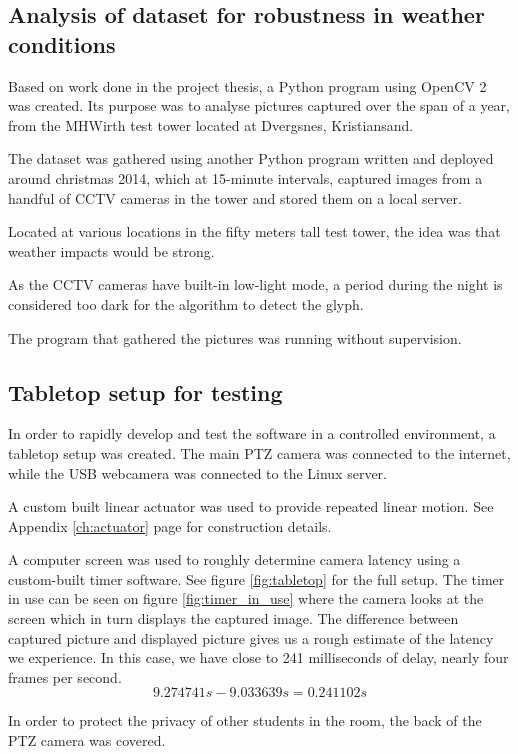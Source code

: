 \subsection{Analysis of dataset for robustness in weather conditions}
Based on work done in the project thesis, a Python program using OpenCV 2 was created. Its purpose was to analyse pictures captured over the span of a year, from the MHWirth test tower located at Dvergsnes, Kristiansand.

The dataset was gathered using another Python program written and deployed around christmas 2014, which at 15-minute intervals, captured images from a handful of CCTV cameras in the tower and stored them on a local server.

Located at various locations in the fifty meters tall test tower, the idea was that weather impacts would be strong.

As the CCTV cameras have built-in low-light mode, a period during the night is considered too dark for the algorithm to detect the glyph.

The program that gathered the pictures was running without supervision.

\subsection{Tabletop setup for testing}
In order to rapidly develop and test the software in a controlled environment, a tabletop setup was created. The main PTZ camera was connected to the internet, while the USB webcamera was connected to the Linux server.

A custom built linear actuator was used to provide repeated linear motion. See Appendix \ref{ch:actuator} page \pageref{ch:actuator} for construction details.

A computer screen was used to roughly determine camera latency using a custom-built timer software. See figure \ref{fig:tabletop} for the full setup. The timer in use can be seen on figure \ref{fig:timer_in_use} where the camera looks at the screen which in turn displays the captured image. The difference between captured picture and displayed picture gives us a rough estimate of the latency we experience. In this case, we have close to 241 milliseconds of delay, nearly four frames per second.
\begin{equation}
9.274741s - 9.033639s = 0.241102s
\end{equation}

In order to protect the privacy of other students in the room, the back of the PTZ camera was covered.

